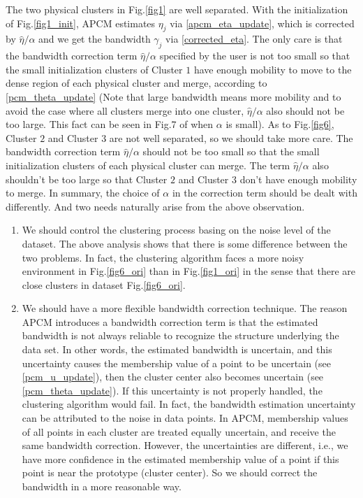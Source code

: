 \documentclass[journal,transmag]{IEEEtran}
\theoremstyle{definition}
\begin{document}
The two physical clusters in Fig.\ref{fig1} are well separated. With the initialization of Fig.\ref{fig1_init}, APCM estimates $\eta_j$ via \eqref{apcm_eta_update}, which is corrected by $\hat{\eta}/\alpha$ and we get the bandwidth $\gamma_j$ via \eqref{corrected_eta}. The only care is that the bandwidth correction term $\hat{\eta}/\alpha$ specified by the user is not too small so that the small initialization clusters of Cluster $1$ have enough mobility to move to the dense region of each physical cluster and  merge, according to \eqref{pcm_theta_update} (Note that large bandwidth means more mobility and to avoid the case where all clusters merge into one cluster, $\hat{\eta}/\alpha$ also should not be too large. This fact can be seen in Fig.7 of \cite{xenaki_novel_2016} when $\alpha$ is small).
As to Fig.\ref{fig6}, Cluster $2$ and Cluster $3$ are not well separated, so we should take more care. The bandwidth correction term $\hat{\eta}/\alpha$ should not be too small so that the small initialization clusters of each physical cluster can merge. The term $\hat{\eta}/\alpha$ also shouldn't be too large so that Cluster $2$ and Cluster $3$ don't have enough mobility to merge.
In summary, the choice of $\alpha$ in the correction term should be dealt with differently. And two needs naturally arise from the above observation.
\begin{enumerate}
\item We should control the clustering process basing on the noise level of the dataset. The above analysis shows that there is some difference between the two problems. In fact, the clustering algorithm faces a more noisy environment in Fig.\ref{fig6_ori} than in Fig.\ref{fig1_ori} in the sense that there are close clusters in dataset Fig.\ref{fig6_ori}.
\item We should have a more flexible bandwidth correction technique.
The reason APCM introduces a bandwidth correction term is that the estimated bandwidth is not always reliable to recognize the structure underlying the data set.
In other words, the estimated bandwidth is uncertain, and this uncertainty causes the membership value of a point to be uncertain (see \eqref{pcm_u_update}), then the cluster center also becomes uncertain (see \eqref{pcm_theta_update}). If this uncertainty is not properly handled, the clustering algorithm would fail.
In fact, the bandwidth estimation uncertainty can be attributed to the noise in data points.
In APCM, membership values of all points in each cluster are treated equally uncertain, and receive the same bandwidth correction.
However, the uncertainties are different, i.e., we have more confidence in the estimated membership value of a point if this point is near the prototype (cluster center).
So we should correct the bandwidth in a more reasonable way.
\end{enumerate}
\end{document}
